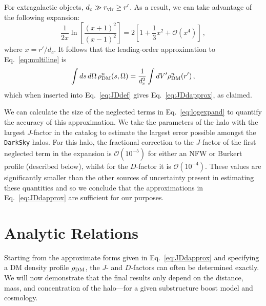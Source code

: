 For extragalactic objects, $d_c \gg r_{\rm vir} \geq r'$.  As a result, we can take advantage of the following  expansion:
\begin{equation}
\frac{1}{2x} \ln \left[ \frac{(x+1)^2}{(x-1)^2} \right]  = 2 \left[ 1 + \frac{1}{3} x^2 + \mathcal{O} \left(x^4\right) \right] \, ,
\label{eq:logexpand}
\end{equation}
where $x= r'/d_c$.  It follows that the leading-order approximation to Eq.~\ref{eq:multiline} is \begin{equation}\begin{aligned}
\int ds \, d\Omega \,\rho_{\rm DM}^n(s,\Omega) = \frac{1}{d_c^2} \int dV' \rho_{\rm DM}^n(r') \,,
\end{aligned}\end{equation}
which when inserted into Eq.~\ref{eq:JDdef} gives Eq.~\ref{eq:JDdapprox}, as claimed. 

We can calculate the size of the neglected terms in Eq.~\ref{eq:logexpand} to quantify the accuracy of this approximation.  We take the parameters of the halo with the largest $J$-factor in the catalog to estimate the largest error possible amongst the \texttt{DarkSky} halos.  For this halo, the fractional correction to the $J$-factor of the first neglected term in the expansion is $\mathcal{O}(10^{-5})$ for either an NFW or Burkert profile (described below), whilst for the $D$-factor it is $\mathcal{O}(10^{-4})$. These values are significantly smaller than the other sources of uncertainty present in estimating these quantities and so we conclude that the approximations in Eq.~\ref{eq:JDdapprox} are sufficient for our purposes.



\section{Analytic Relations}

Starting from the approximate forms given in Eq.~\ref{eq:JDdapprox} and specifying a DM density profile $\rho_{\rm DM}$, the $J$- and $D$-factors can often be determined exactly.   We will now demonstrate that the final results only depend on the distance, mass, and concentration of the halo---for a given substructure boost model and cosmology.

